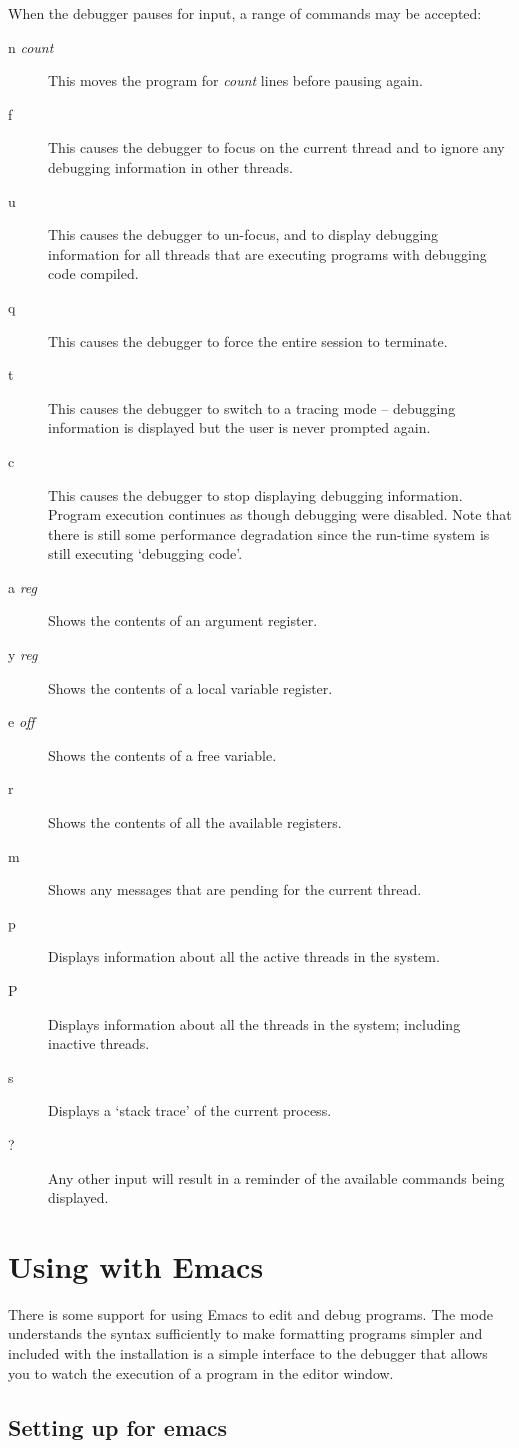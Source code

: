 When the debugger pauses for input, a range of commands may be accepted:
\begin{description}
\item[n \emph{count}]
This moves the program for \emph{count} lines before pausing again.
\item[f]
This causes the debugger to focus on the current thread and to ignore any debugging information in other threads.
\item[u]
This causes the debugger to un-focus, and to display debugging information for all threads that are executing programs with debugging code compiled.
\item[q]
This causes the debugger to force the entire \go session to terminate.
\item[t]
This causes the debugger to switch to a tracing mode -- debugging information is displayed but the user is never prompted again.
\item[c]
This causes the debugger to stop displaying debugging information. Program execution continues as though debugging were disabled. Note that there is still some performance degradation since the run-time system is still executing `debugging code'.
\item[a \emph{reg}]
Shows the contents of an argument register.
\item[y \emph{reg}]
Shows the contents of a local variable register.
\item[e \emph{off}]
Shows the contents of a free variable.
\item[r]
Shows the contents of all the available registers.
\item[m]
Shows any messages that are pending for the current thread.
\item[p]
Displays information about all the active threads in the system.
\item[P]
Displays information about all the threads in the system; including inactive threads.
\item[s]
Displays a `stack trace' of the current process.
\item[?]
Any other input will result in a reminder of the available commands being displayed.
\end{description}

\section{Using \go with Emacs}
\label{emacs:go}

There is some support for using Emacs to edit and debug \go programs. The  mode understands the \go syntax sufficiently to make formatting programs simpler and included with the installation is a simple interface to the \go debugger that allows you to watch the execution of a program in the editor window.

\subsection{Setting up for emacs}
\label{emacs:setup}



\subsection{}
\label{emacs:go-mode}
